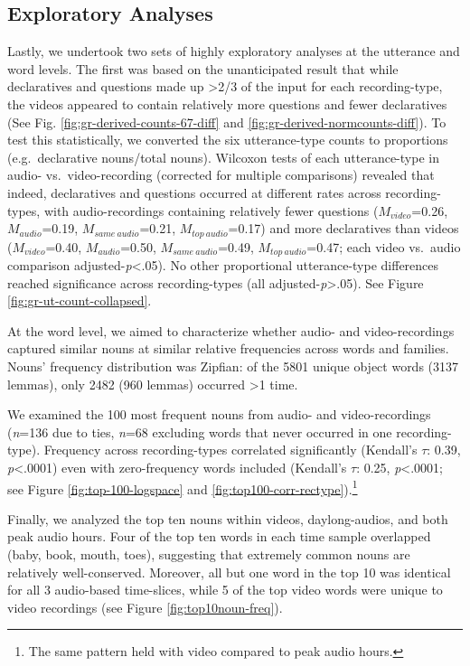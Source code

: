 \documentclass[man]{apa6}
\theoremstyle{definition}
\theoremstyle{definition}
\theoremstyle{definition}
\theoremstyle{remark}
\begin{document}
\subsection{Exploratory Analyses}\label{exploratory-analyses}

Lastly, we undertook two sets of highly exploratory analyses at the
utterance and word levels. The first was based on the unanticipated
result that while declaratives and questions made up \textgreater{}2/3
of the input for each recording-type, the videos appeared to contain
relatively more questions and fewer declaratives (See Fig.
\ref{fig:gr-derived-counts-67-diff} and
\ref{fig:gr-derived-normcounts-diff}). To test this statistically, we
converted the six utterance-type counts to proportions (e.g.~declarative
nouns/total nouns). Wilcoxon tests of each utterance-type in audio-
vs.~video-recording (corrected for multiple comparisons) revealed that
indeed, declaratives and questions occurred at different rates across
recording-types, with audio-recordings containing relatively fewer
questions (\(M_{video}\)=0.26, \(M_{audio}\)=0.19,
\(M_{same\  audio}\)=0.21, \(M_{top\  audio}\)=0.17) and more
declaratives than videos (\(M_{video}\)=0.40, \(M_{audio}\)=0.50,
\(M_{same\  audio}\)=0.49, \(M_{top\ audio}\)=0.47; each video vs.~audio
comparison adjusted-\emph{p}\textless{}.05). No other proportional
utterance-type differences reached significance across recording-types
(all adjusted-\emph{p}\textgreater{}.05). See Figure
\ref{fig:gr-ut-count-collapsed}.

At the word level, we aimed to characterize whether audio- and
video-recordings captured similar nouns at similar relative frequencies
across words and families. Nouns' frequency distribution was Zipfian: of
the 5801 unique object words (3137 lemmas), only 2482 (960 lemmas)
occurred \textgreater{}1 time.

We examined the 100 most frequent nouns from audio- and video-recordings
(\emph{n}=136 due to ties, \emph{n}=68 excluding words that never
occurred in one recording-type). Frequency across recording-types
correlated significantly (Kendall's \(\tau\): 0.39,
\emph{p}\textless{}.0001) even with zero-frequency words included
(Kendall's \(\tau\): 0.25, \emph{p}\textless{}.0001; see Figure
\ref{fig:top-100-logspace} and
\ref{fig:top100-corr-rectype}).\footnote{The same pattern held with video compared to peak audio hours.}

Finally, we analyzed the top ten nouns within videos, daylong-audios,
and both peak audio hours. Four of the top ten words in each time sample
overlapped (baby, book, mouth, toes), suggesting that extremely common
nouns are relatively well-conserved. Moreover, all but one word in the
top 10 was identical for all 3 audio-based time-slices, while 5 of the
top video words were unique to video recordings (see Figure
\ref{fig:top10noun-freq}).
\end{document}
